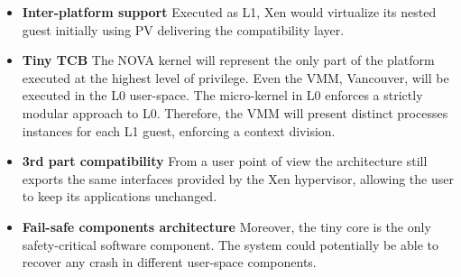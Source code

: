 \documentclass{sig-alternate}
\begin{document}
\begin{itemize}[]
\item \textbf{Inter-platform support} Executed as L1, Xen would virtualize its nested guest initially using PV delivering the compatibility layer.
\item \textbf{Tiny TCB} The NOVA kernel will represent the only part of the platform executed at the highest level of privilege. Even the VMM, Vancouver, will be executed in the L0 user-space. The micro-kernel in L0 enforces a strictly modular approach to L0. Therefore, the VMM will present distinct processes instances for each L1 guest, enforcing a context division.
\item \textbf{3rd part compatibility} From a user point of view the architecture still exports the same interfaces provided by the Xen hypervisor, allowing the user to keep its applications unchanged.
\item \textbf{Fail-safe components architecture}  Moreover, the tiny core is the only safety-critical software component. The system could potentially be able to recover any crash in different user-space components.
\end{itemize}
\end{document}

